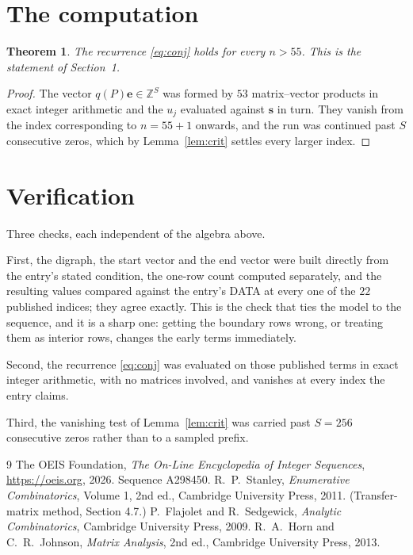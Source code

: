 \documentclass[11pt,a4paper]{article}
\theoremstyle{plain}
\newtheorem{theorem}{Theorem}
\theoremstyle{definition}
\begin{document}
\section{The computation}

\begin{theorem}
The recurrence \eqref{eq:conj} holds for every $n>55$. This is the statement of
Section~1.
\end{theorem}

\begin{proof}
The vector $q(P)\mathbf{e}\in\mathbb{Z}^{S}$ was formed by $53$ matrix--vector
products in exact integer arithmetic and the $u_j$ evaluated against $\mathbf{s}$ in turn.
They vanish from the index corresponding to $n=55+1$ onwards, and the run was continued
past $S$ consecutive zeros, which by Lemma~\ref{lem:crit} settles every larger index.
\end{proof}

\section{Verification}

Three checks, each independent of the algebra above.

First, the digraph, the start vector and the end vector were built directly from the
entry's stated condition, the one-row count computed separately, and the resulting values
compared against the entry's DATA at every one of the $22$ published indices; they
agree exactly. This is the check that ties the model to the sequence, and it is a sharp one:
getting the boundary rows wrong, or treating them as interior rows, changes the early terms
immediately.

Second, the recurrence \eqref{eq:conj} was evaluated on those published terms in exact
integer arithmetic, with no matrices involved, and vanishes at every index the entry claims.

Third, the vanishing test of Lemma~\ref{lem:crit} was carried past $S=256$ consecutive
zeros rather than to a sampled prefix.

\begin{thebibliography}{9}
 The OEIS Foundation, \emph{The On-Line Encyclopedia of Integer
Sequences}, \url{https://oeis.org}, 2026. Sequence A298450.
 R.~P.~Stanley, \emph{Enumerative Combinatorics}, Volume 1, 2nd ed.,
Cambridge University Press, 2011. (Transfer-matrix method, Section 4.7.)
 P.~Flajolet and R.~Sedgewick, \emph{Analytic Combinatorics}, Cambridge
University Press, 2009.
 R.~A.~Horn and C.~R.~Johnson, \emph{Matrix Analysis}, 2nd ed., Cambridge
University Press, 2013.
\end{thebibliography}
\end{document}
